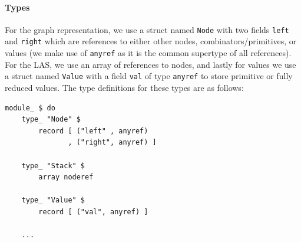 \paragraph{Types} For the graph representation, we use a struct named \texttt{Node} with two fields \texttt{left} and \texttt{right} which are references to either other nodes, combinators/primitives, or values (we make use of \texttt{anyref} as it is the common supertype of all references). For the LAS, we use an array of references to nodes, and lastly for values we use a struct named \texttt{Value} with a field \texttt{val} of type \texttt{anyref} to store primitive or fully reduced values. The type definitions for these types are as follows:
\begin{verbatim}
module_ $ do
    type_ "Node" $
        record [ ("left" , anyref)
               , ("right", anyref) ]

    type_ "Stack" $
        array noderef

    type_ "Value" $
        record [ ("val", anyref) ]

    ...

\end{verbatim}


